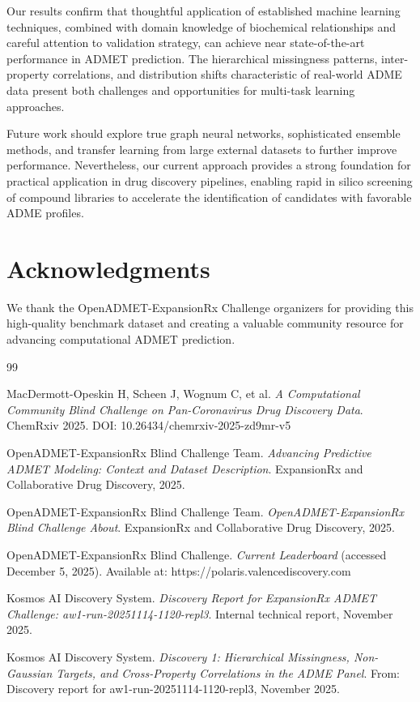\documentclass[11pt,a4paper]{article}
\begin{document}
Our results confirm that thoughtful application of established machine learning techniques, combined with domain knowledge of biochemical relationships and careful attention to validation strategy, can achieve near state-of-the-art performance in ADMET prediction. The hierarchical missingness patterns, inter-property correlations, and distribution shifts characteristic of real-world ADME data present both challenges and opportunities for multi-task learning approaches.

Future work should explore true graph neural networks, sophisticated ensemble methods, and transfer learning from large external datasets to further improve performance. Nevertheless, our current approach provides a strong foundation for practical application in drug discovery pipelines, enabling rapid in silico screening of compound libraries to accelerate the identification of candidates with favorable ADME profiles.

\section*{Acknowledgments}

We thank the OpenADMET-ExpansionRx Challenge organizers for providing this high-quality benchmark dataset and creating a valuable community resource for advancing computational ADMET prediction.


\begin{thebibliography}{99}

MacDermott-Opeskin H, Scheen J, Wognum C, et al.
\textit{A Computational Community Blind Challenge on Pan-Coronavirus Drug Discovery Data}.
ChemRxiv 2025.
DOI: 10.26434/chemrxiv-2025-zd9mr-v5

OpenADMET-ExpansionRx Blind Challenge Team.
\textit{Advancing Predictive ADMET Modeling: Context and Dataset Description}.
ExpansionRx and Collaborative Drug Discovery, 2025.

OpenADMET-ExpansionRx Blind Challenge Team.
\textit{OpenADMET-ExpansionRx Blind Challenge About}.
ExpansionRx and Collaborative Drug Discovery, 2025.

OpenADMET-ExpansionRx Blind Challenge.
\textit{Current Leaderboard} (accessed December 5, 2025).
Available at: https://polaris.valencediscovery.com

Kosmos AI Discovery System.
\textit{Discovery Report for ExpansionRx ADMET Challenge: aw1-run-20251114-1120-repl3}.
Internal technical report, November 2025.

Kosmos AI Discovery System.
\textit{Discovery 1: Hierarchical Missingness, Non-Gaussian Targets, and Cross-Property Correlations in the ADME Panel}.
From: Discovery report for aw1-run-20251114-1120-repl3, November 2025.

\end{thebibliography}
\end{document}
